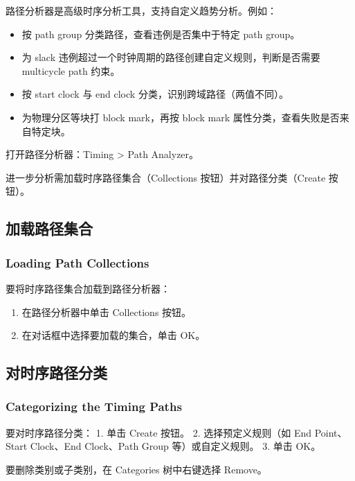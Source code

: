 路径分析器是高级时序分析工具，支持自定义趋势分析。例如：
\begin{itemize}
  \item 按 path group 分类路径，查看违例是否集中于特定 path group。
  \item 为 slack 违例超过一个时钟周期的路径创建自定义规则，判断是否需要 multicycle path 约束。
  \item 按 start clock 与 end clock 分类，识别跨域路径（两值不同）。
  \item 为物理分区等块打 block mark，再按 block mark 属性分类，查看失败是否来自特定块。
\end{itemize}

打开路径分析器：Timing > Path Analyzer。


进一步分析需加载时序路径集合（Collections 按钮）并对路径分类（Create 按钮）。


\subsection{加载路径集合}
\subsubsection*{Loading Path Collections}

要将时序路径集合加载到路径分析器：
\begin{enumerate}
  \item 在路径分析器中单击 Collections 按钮。
  \item 在对话框中选择要加载的集合，单击 OK。
\end{enumerate}

\subsection{对时序路径分类}
\subsubsection*{Categorizing the Timing Paths}

要对时序路径分类：
1. 单击 Create 按钮。
2. 选择预定义规则（如 End Point、Start Clock、End Clock、Path Group 等）或自定义规则。
3. 单击 OK。

要删除类别或子类别，在 Categories 树中右键选择 Remove。

